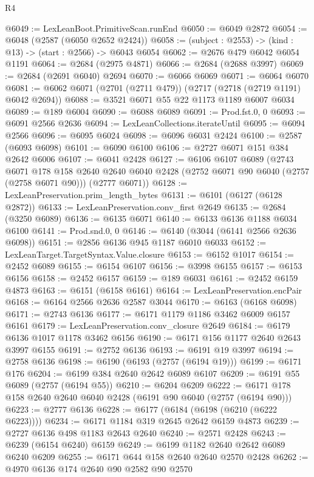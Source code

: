 \begin{lexlean}{R4}
\begin{coremodule}
@6049 := LexLeanBoot.PrimitiveScan.runEnd
@6050 := @6049 @2872
@6054 := @6048 (@2587 (@6050 @2652 @2424))
@6058 := (subject : @2553) -> (kind : @13) -> (start : @2566) -> @6043 @6054
@6062 := @2676 @479 @6042 @6054 @1191
@6064 := @2684 (@2975 @4871)
@6066 := @2684 (@2688 @3997)
@6069 := @2684 (@2691 @6040) @2694
@6070 := @6066 @6069
@6071 := @6064 @6070
@6081 := @6062 @6071 (@2701 (@2711 @479)) (@2717 (@2718 (@2719 @1191) @6042 @2694))
@6088 := @3521 @6071 @55 @22 @1173 @1189 @6007 @6034
@6089 := @189 @6004
@6090 := @6088 @6089
@6091 := Prod.fst.{0, 0}
@6093 := @6091 @2566 @2636
@6094 := LexLeanCollections.iterateUntil
@6095 := @6094 @2566
@6096 := @6095 @6024
@6098 := @6096 @6031 @2424
@6100 := @2587 (@6093 @6098)
@6101 := @6090 @6100
@6106 := @2727 @6071 @151 @384 @2642 @6006
@6107 := @6041 @2428
@6127 := @6106
    @6107
    @6089
    (@2743
      @6071
      @178
      @158
      @2640
      @2640
      @6040
      @2428
      (@2752 @6071 @90 @6040 (@2757 (@2758 @6071 @90)))
      (@2777 @6071))
@6128 := LexLeanPreservation.prim_length_bytes
@6131 := @6101 (@6127 (@6128 @2872))
@6133 := LexLeanPreservation.conv_first @2649
@6135 := @2684 (@3250 @6089)
@6136 := @6135 @6071
@6140 := @6133 @6136 @1188 @6034 @6100
@6141 := Prod.snd.{0, 0}
@6146 := @6140 (@3044 (@6141 @2566 @2636 @6098))
@6151 := @2856 @6136 @945 @1187 @6010 @6033
@6152 := LexLeanTarget.TargetSyntax.Value.closure
@6153 := @6152 @1017
@6154 := @2452 @6089
@6155 := @6154 @6107
@6156 := @3998 @6155
@6157 := @6153 @6156
@6158 := @2452 @6157
@6159 := @189 @6031
@6161 := @2452 @6159 @4873
@6163 := @6151 (@6158 @6161)
@6164 := LexLeanPreservation.encPair
@6168 := @6164 @2566 @2636 @2587 @3044
@6170 := @6163 (@6168 @6098)
@6171 := @2743 @6136
@6177 := @6171 @1179 @1186 @3462 @6009 @6157 @6161
@6179 := LexLeanPreservation.conv_closure @2649
@6184 := @6179 @6136 @1017 @1178 @3462 @6156
@6190 := @6171 @156 @1177 @2640 @2643 @3997 @6155
@6191 := @2752 @6136
@6193 := @6191 @19 @3997
@6194 := @2758 @6136
@6198 := @6190 (@6193 (@2757 (@6194 @19)))
@6199 := @6171 @176
@6204 := @6199 @384 @2640 @2642 @6089 @6107
@6209 := @6191 @55 @6089 (@2757 (@6194 @55))
@6210 := @6204 @6209
@6222 := @6171 @178 @158 @2640 @2640 @6040 @2428 (@6191 @90 @6040 (@2757 (@6194 @90)))
@6223 := @2777 @6136
@6228 := @6177 (@6184 (@6198 (@6210 (@6222 @6223))))
@6234 := @6171 @1184 @319 @2645 @2642 @6159 @4873
@6239 := @2727 @6136 @498 @1183 @2643 @2640
@6240 := @2571 @2428
@6243 := @6239 (@6154 @6240) @6159
@6249 := @6199 @1182 @2640 @2642 @6089 @6240 @6209
@6255 := @6171 @644 @158 @2640 @2640 @2570 @2428
@6262 := @4970 @6136 @174 @2640 @90 @2582 @90 @2570

\end{coremodule}
\end{lexlean}
